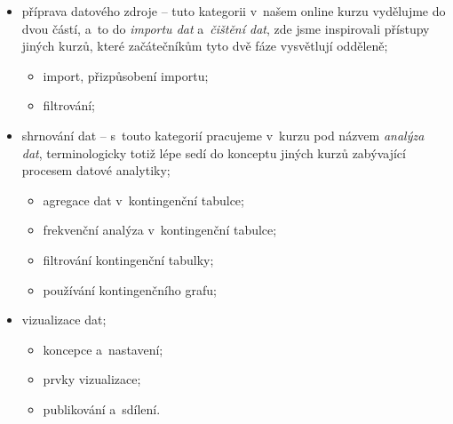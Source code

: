 \begin{itemize}
\tightlist
\item
  příprava datového zdroje -- tuto kategorii v~našem online kurzu vydělujme do dvou částí, a~to do \emph{importu dat} a~\emph{čištění dat}, zde jsme inspirovali přístupy jiných kurzů, které začátečníkům tyto dvě fáze vysvětlují odděleně;

  \begin{itemize}
  \tightlist
  \item
    import, přizpůsobení importu;
  \item
    filtrování;
  \end{itemize}
\item
  shrnování dat -- s~touto kategorií pracujeme v~kurzu pod názvem \emph{analýza dat}, terminologicky totiž lépe sedí do konceptu jiných kurzů zabývající procesem datové analytiky;

  \begin{itemize}
  \tightlist
  \item
    agregace dat v~kontingenční tabulce;
  \item
    frekvenční analýza v~kontingenční tabulce;
  \item
    filtrování kontingenční tabulky;
  \item
    používání kontingenčního grafu;
  \end{itemize}
\item
  vizualizace dat;

  \begin{itemize}
  \tightlist
  \item
    koncepce a~nastavení;
  \item
    prvky vizualizace;
  \item
    publikování a~sdílení.
  \end{itemize}
\end{itemize}
